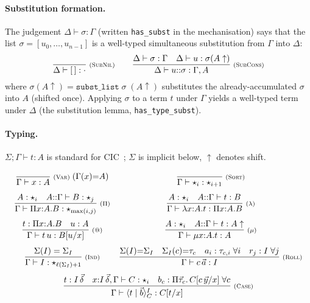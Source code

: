 \documentclass[runningheads]{llncs}
\begin{document}
\paragraph{Substitution formation.}
The judgement $\Delta\vdash\sigma:\Gamma$ (written \texttt{has\_subst} in the
mechanisation) says that the list $\sigma=[u_0,\dots,u_{n-1}]$ is a
well-typed simultaneous substitution from $\Gamma$ into $\Delta$:
\[
\dfrac{}{\Delta\vdash[\,]:\cdot}\;{\scriptstyle(\textsc{SubNil})}
\qquad
\dfrac{\Delta\vdash\sigma:\Gamma\quad \Delta\vdash u:\sigma(A\uparrow)}%
      {\Delta\vdash u{::}\sigma:\Gamma,A}\;{\scriptstyle(\textsc{SubCons})}
\]
where $\sigma(A\uparrow) = \texttt{subst\_list}\;\sigma\;(A\uparrow)$
substitutes the already-accumulated $\sigma$ into $A$ (shifted once).
Applying $\sigma$ to a term $t$ under $\Gamma$ yields a well-typed term
under $\Delta$ (the substitution lemma,
\texttt{has\_type\_subst}).

\paragraph{Typing.}
$\Sigma;\Gamma\vdash t:A$ is standard for
CIC~\cite{coquand-huet-1988-coc,paulin-mohring-1993-inductive};
$\Sigma$ is implicit below, $\uparrow$ denotes shift.

\[
\begin{array}{c@{\quad}c}
\dfrac{}{\Gamma\vdash x:A}\;{\scriptstyle(\textsc{Var})}\;(\Gamma(x){=}A)
&
\dfrac{}{\Gamma\vdash\star_i:\star_{i+1}}\;{\scriptstyle(\textsc{Sort})}
\\[14pt]
\dfrac{A:\star_i\quad A{::}\Gamma\vdash B:\star_j}%
      {\Gamma\vdash\Pi x{:}A.B:\star_{\max(i,j)}}\;{\scriptstyle(\Pi)}
&
\dfrac{A:\star_i\quad A{::}\Gamma\vdash t:B}%
      {\Gamma\vdash\lambda x{:}A.t:\Pi x{:}A.B}\;{\scriptstyle(\lambda)}
\\[14pt]
\dfrac{t:\Pi x{:}A.B\quad u:A}%
      {\Gamma\vdash t\,u:B[u/x]}\;{\scriptstyle(@)}
&
\dfrac{A:\star_i\quad A{::}\Gamma\vdash t:A\uparrow}%
      {\Gamma\vdash\mu x{:}A.t:A}\;{\scriptstyle(\mu)}
\\[14pt]
\dfrac{\Sigma(I)=\Sigma_I}%
      {\Gamma\vdash I:\star_{\ell(\Sigma_I)+1}}\;{\scriptstyle(\textsc{Ind})}
&
\dfrac{\Sigma(I){=}\Sigma_I\quad \Sigma_I(c){=}\tau_c\quad
       a_i:\tau_{c,i}\;\forall i\quad r_j:I\;\forall j}%
      {\Gamma\vdash c\,\vec a:I}\;{\scriptstyle(\textsc{Roll})}
\\[14pt]
\multicolumn{2}{c}{%
  \dfrac{t:I\,\vec\delta\quad
         x{:}I\,\vec\delta,\Gamma\vdash C:\star_i\quad
         b_c:\Pi\vec\tau_c.\,C[c\,\vec y/x]\;\forall c}%
        {\Gamma\vdash\langle t \mid \vec b \rangle^I_C:C[t/x]}\;{\scriptstyle(\textsc{Case})}
}
\end{array}
\]
\end{document}
